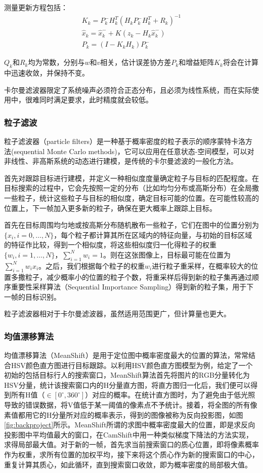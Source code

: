   测量更新方程包括：
\begin{gather*}
K_k=P^{-}_k H^T_k(H_k P^{-}_k H^T_k + R_k)^{-1} \\
\hat{x}_k = \hat{x}^{-}_k + K (z_k - H_k \hat{x}^{-}_k) \\
P_k = (I-K_k H_k)P^{-}_k
\end{gather*}

  $Q_k$和$R_k$均为常数，分别与$w$和$v$相关，估计误差协方差$P_k$和增益矩阵$K_k$将会在计算中迅速收敛，并保持不变。

  卡尔曼滤波器限定了系统噪声必须符合正态分布，且必须为线性系统，而在实际使用中，很难同时满足要求，此时精度就会较低。

\subsubsection{粒子滤波}

  粒子滤波器（particle filters）是一种基于概率密度的粒子表示的顺序蒙特卡洛方法(sequential Monte Carlo methods)，它可以应用在任意状态-空间模型，可以对非线性、非高斯系统的动态进行建模，是传统的卡尔曼滤波的一般化方法\cite{arulampalam2002tutorial}。

  首先对跟踪目标进行建模，并定义一种相似度度量确定粒子与目标的匹配程度。在目标搜索的过程中，它会先按照一定的分布（比如均匀分布或高斯分布）在全局撒一些粒子，统计这些粒子与目标的相似度，确定目标可能的位置。在可能性较高的位置上，下一帧加入更多新的粒子，确保在更大概率上跟踪上目标。

  首先在目标周围均匀地或按高斯分布随机散布一些粒子，它们在图中的位置分别为$\{x_i,i=0,\dots,N\}$，每个粒子都计算其所在区域内的特征向量，与初始的目标区域的特征作比较，得到一个相似度，将这些相似度归一化得粒子的权重$\{w_i,i=1,\dots,N\}$，$\sum_{i=1}^N w_i = 1$。则在这张图像上，目标最可能在位置为$\sum_{i=1}^N w_i x_i$。之后，我们根据每个粒子的权重$w_i$进行粒子重采样，在概率较大的位置多撒粒子，减少概率小的位置的粒子个数，将重采样后得到新的粒子集再通过顺序重要性采样算法（Sequential Importance Sampling）得到新的粒子集，用于下一帧的目标识别。

  粒子滤波器相对于卡尔曼滤波器，虽然适用范围更广，但计算量也更大。

\subsubsection{均值漂移算法}
 
  均值漂移算法（MeanShift）是用于定位图中概率密度最大的位置的算法，常常结合HSV颜色直方图进行目标跟踪。以利用HSV颜色直方图模型为例，给定了一个初始的包括目标行人的搜索窗口，MeanShift算法首先将图片的RGB分量转化为HSV分量，统计该搜索窗口内的H分量直方图，将直方图归一化后，我们便可以得到所有H值（$\in [0^{\circ},360^{\circ}]$）对应的概率。在统计直方图时，为了避免由于低光照导致的错误数据，将V值低于某一阈值的像素点不予统计。接着，将全图的所有像素值都用它的H分量所对应的概率表示，得到的图像被称为反向投影图，如图\ref{fig:backproject}所示。MeanShift所谓的求图中概率密度最大的位置，即是求反向投影图中平均值最大的窗口，在CamShift中用一种类似梯度下降法的方法实现，求得局部最大值。对于新的一帧，首先求当前搜索窗口的质心位置，即将像素概率作为权重，求所有位置的加权平均，接下来将这个质心作为新的搜索窗口的中心，重复计算其质心，如此循环，直到搜索窗口收敛，即为概率密度的局部极大值。

